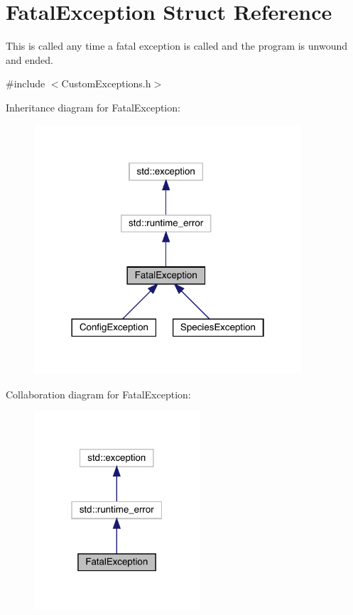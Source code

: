 \hypertarget{struct_fatal_exception}{}\section{Fatal\+Exception Struct Reference}
\label{struct_fatal_exception}


This is called any time a fatal exception is called and the program is unwound and ended.  




{\ttfamily \#include $<$Custom\+Exceptions.\+h$>$}



Inheritance diagram for Fatal\+Exception\+:
\nopagebreak
\begin{figure}[H]
\begin{center}
\leavevmode
\includegraphics[width=282pt]{struct_fatal_exception__inherit__graph}
\end{center}
\end{figure}


Collaboration diagram for Fatal\+Exception\+:
\nopagebreak
\begin{figure}[H]
\begin{center}
\leavevmode
\includegraphics[width=175pt]{struct_fatal_exception__coll__graph}
\end{center}
\end{figure}
